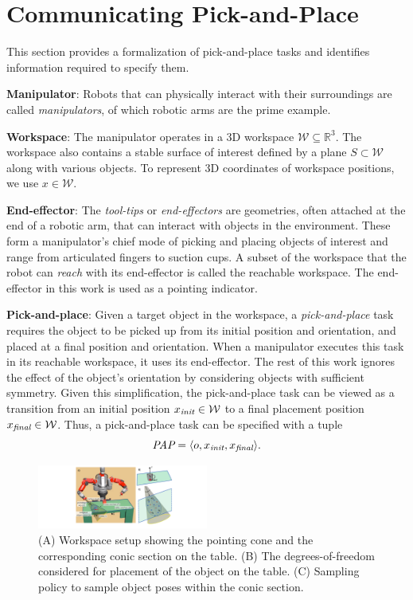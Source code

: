 \section{Communicating Pick-and-Place}
\label{problem}

This section provides a formalization of pick-and-place tasks and identifies information required to specify them.
 
\noindent\textbf{Manipulator}: Robots that can physically interact with their surroundings are called \textit{manipulators}, of which robotic arms are the prime example. 

\noindent\textbf{Workspace}: The manipulator operates in a 3D workspace $\mathcal{W} \subseteq \mathbb{R}^3$. The workspace also contains a stable surface of interest defined by a plane $S\subset\mathcal{W}$ along with various objects. To represent 3D coordinates of workspace positions, we use $x\in\mathcal{W}$. 

\noindent\textbf{End-effector}: The \textit{tool-tips} or \textit{end-effectors} are geometries, often attached at the end of a robotic arm, that can interact with objects in the environment. These form a manipulator's chief mode of picking and placing objects of interest and range from articulated fingers to suction cups. A subset of the workspace that the robot can \textit{reach} with its end-effector is called the reachable workspace. The end-effector in this work is used as a pointing indicator.

\noindent\textbf{Pick-and-place}: Given a target object in the workspace, a \textit{pick-and-place} task requires the object to be picked up from its initial position and orientation, and placed at a final position and orientation. When a manipulator executes this task in its reachable workspace, it uses its end-effector. 
The rest of this work ignores the effect of the object's orientation by considering objects with sufficient symmetry. Given this simplification, the pick-and-place task can be viewed as a transition from an initial position $x_{\textit{init}}\in\mathcal{W}$ to a final placement position $x_{\textit{final}}\in\mathcal{W}$.  Thus, a pick-and-place task can be specified with a tuple
$$ \textit{PAP} = \langle o, x_{\textit{init}}, x_{\textit{final}} \rangle. $$


\begin{figure}[t]
\centering
\includegraphics[width=0.5\textwidth]{pointing_diagram}
\caption{(A) Workspace setup showing the pointing cone and the corresponding conic section on the table. (B) The degrees-of-freedom considered for placement of the object on the table. (C) Sampling policy to sample object poses within the conic section.}
    \label{fig:pointing}
\end{figure}

